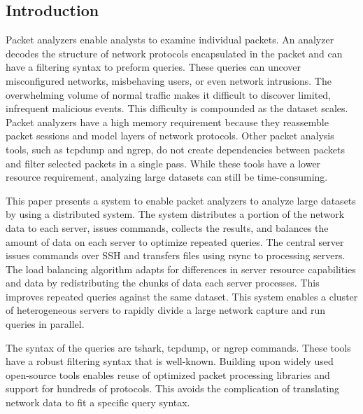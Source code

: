 \documentclass{article}
\begin{document}
\begin{multicols}{2}
  
\section*{Introduction} %


Packet analyzers enable analysts to examine individual packets.  An analyzer decodes the structure of network protocols encapsulated in the packet and can have a filtering syntax to preform queries.  These queries can uncover misconfigured networks, misbehaving users, or even network intrusions. The overwhelming volume of normal traffic makes it difficult to discover limited, infrequent malicious events. This difficulty is compounded as the dataset scales. Packet analyzers have a high memory requirement \cite{wireshark} because they reassemble packet sessions and model layers of network protocols.  Other packet analysis tools, such as tcpdump and ngrep, do not create dependencies between packets and filter selected packets in a single pass. While these tools have a lower resource requirement, analyzing large datasets can still be time-consuming. 

This paper presents a system to enable packet analyzers to analyze large datasets by using a distributed system. The system distributes a portion of the network data to each server, issues commands, collects the results, and balances the amount of data on each server to optimize repeated queries. The central server issues commands over SSH and transfers files using rsync to processing servers. The load balancing algorithm adapts for differences in server resource capabilities and data by redistributing the chunks of data each server processes. This improves repeated queries against the same dataset. This system enables a cluster of heterogeneous servers to rapidly divide a large network capture and run queries in parallel. 

The syntax of the queries are tshark, tcpdump, or ngrep commands. These tools have a robust filtering syntax that is well-known. Building upon widely used open-source tools enables reuse of optimized packet processing libraries and support for hundreds of protocols. This avoids the complication of translating network data to fit a specific query syntax.  


\end{multicols}
\end{document}
